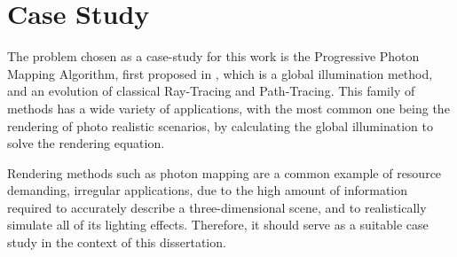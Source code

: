 \documentclass[main.tex]{subfiles}
\begin{document}
\section{Case Study}

The problem chosen as a case-study for this work is the Progressive Photon Mapping Algorithm, first proposed in \cite{hachisuka2008progressive}, which is a global illumination method, and an evolution of classical Ray-Tracing and Path-Tracing. This family of methods has a wide variety of applications, with the most common one being the rendering of photo realistic scenarios, by calculating the global illumination to solve the rendering equation.

Rendering methods such as photon mapping are a common example of resource demanding, irregular applications, due to the high amount of information required to accurately describe a three-dimensional scene, and to realistically simulate all of its lighting effects. Therefore, it should serve as a suitable case study in the context of this dissertation.

\end{document}
